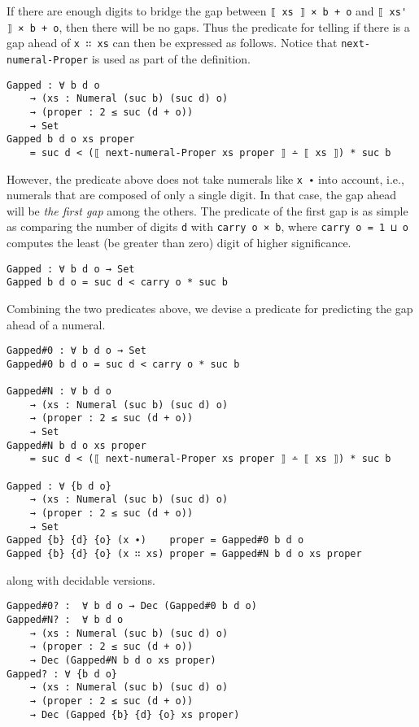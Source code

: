 \documentclass[\main/thesis.tex]{subfiles}
\begin{document}
If there are enough digits to bridge the gap between {\lstinline|⟦ xs ⟧ × b + o|}
and {\lstinline|⟦ xs' ⟧ × b + o|}, then there will be no gaps.
Thus the predicate for telling if there is a gap ahead of {\lstinline|x ∷ xs|}
can then be expressed as follows. Notice that {\lstinline|next-numeral-Proper|}
is used as part of the definition.

\begin{lstlisting}
Gapped : ∀ b d o
    → (xs : Numeral (suc b) (suc d) o)
    → (proper : 2 ≤ suc (d + o))
    → Set
Gapped b d o xs proper
    = suc d < (⟦ next-numeral-Proper xs proper ⟧ ∸ ⟦ xs ⟧) * suc b
\end{lstlisting}

However, the predicate above does not take numerals like {\lstinline|x ∙|} into
account, i.e., numerals that are composed of only a single digit.
In that case, the gap ahead will be \textit{the first gap} among the others.
The predicate of the first gap is as simple as comparing the number of digits
{\lstinline|d|} with {\lstinline|carry o × b|}, where {\lstinline|carry o = 1 ⊔ o|}
computes the least (be greater than zero) digit of higher significance.

\begin{lstlisting}
Gapped : ∀ b d o → Set
Gapped b d o = suc d < carry o * suc b
\end{lstlisting}

Combining the two predicates above, we devise a predicate for predicting the gap
ahead of a numeral.

\begin{lstlisting}
Gapped#0 : ∀ b d o → Set
Gapped#0 b d o = suc d < carry o * suc b

Gapped#N : ∀ b d o
    → (xs : Numeral (suc b) (suc d) o)
    → (proper : 2 ≤ suc (d + o))
    → Set
Gapped#N b d o xs proper
    = suc d < (⟦ next-numeral-Proper xs proper ⟧ ∸ ⟦ xs ⟧) * suc b

Gapped : ∀ {b d o}
    → (xs : Numeral (suc b) (suc d) o)
    → (proper : 2 ≤ suc (d + o))
    → Set
Gapped {b} {d} {o} (x ∙)    proper = Gapped#0 b d o
Gapped {b} {d} {o} (x ∷ xs) proper = Gapped#N b d o xs proper
\end{lstlisting}
%
along with decidable versions.

\begin{lstlisting}
Gapped#0? :  ∀ b d o → Dec (Gapped#0 b d o)
Gapped#N? :  ∀ b d o
    → (xs : Numeral (suc b) (suc d) o)
    → (proper : 2 ≤ suc (d + o))
    → Dec (Gapped#N b d o xs proper)
Gapped? : ∀ {b d o}
    → (xs : Numeral (suc b) (suc d) o)
    → (proper : 2 ≤ suc (d + o))
    → Dec (Gapped {b} {d} {o} xs proper)
\end{lstlisting}
\end{document}
